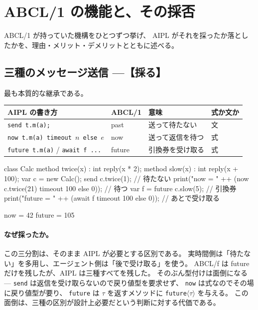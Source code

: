 \documentclass[11pt,a4paper]{ltjsarticle}
\theoremstyle{definition}
\theoremstyle{remark}
\begin{document}
\section{ABCL/1 の機能と、その採否}
\label{sec:abcl}

ABCL/1 が持っていた機構をひとつずつ挙げ、
AIPL がそれを採ったか落としたかを、理由・メリット・デメリットとともに述べる。

\subsection{三種のメッセージ送信 ---【採る】}


最も本質的な継承である。

\begin{center}
\begin{tabular}{llll}
\toprule
AIPL の書き方 & ABCL/1 & 意味 & 式か文か \\
\midrule
\texttt{send t.m(a);}                          & past   & 送って待たない & 文 \\
\texttt{now t.m(a) timeout $n$ else $e$}       & now    & 送って返信を待つ & 式 \\
\texttt{future t.m(a)} / \texttt{await f ...}  & future & 引換券を受け取る & 式 \\
\bottomrule
\end{tabular}
\end{center}

\begin{aipl}
class Calc {
  method twice(x) : int { reply(x * 2); }
  method slow(x)  : int { reply(x + 100); }
}
var c = new Calc();
send c.twice(1);                                            // 待たない
print("now    = " ++ (now c.twice(21) timeout 100 else 0)); // 待つ
var f = future c.slow(5);                                   // 引換券
print("future = " ++ (await f timeout 100 else 0));         // あとで受け取る
\end{aipl}
\begin{term}
now    = 42
future = 105
\end{term}

\paragraph{なぜ採ったか。}
この三分割は、そのまま AIPL が必要とする区別である。
実時間側は「待たない」を多用し、エージェント側は「後で受け取る」を使う。
ABCL/f は future だけを残したが、AIPL は三種すべてを残した。
そのぶん型付けは面倒になる --- \texttt{send} は返信を受け取らないので戻り値型を要求せず、
\texttt{now} は式なのでその場に戻り値型が要り、
\texttt{future} は $\tau$ を返すメソッドに \texttt{future}$\langle\tau\rangle$ を与える。
この面倒は、三種の区別が設計上必要だという判断に対する代価である。
\end{document}
